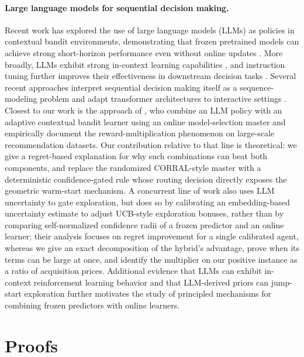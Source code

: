 \documentclass{article}
\theoremstyle{definition}
\theoremstyle{remark}
\theoremstyle{remark}
\begin{document}
\paragraph{Large language models for sequential decision making.}
Recent work has explored the use of large language models (LLMs) as policies
in contextual bandit environments, demonstrating that frozen pretrained
models can achieve strong short-horizon performance even without online
updates \cite{chen2024llmdecision}. More broadly, LLMs exhibit strong
in-context learning capabilities \cite{brown2020language,xie2021explanation,
garg2022can,akyurek2022learning}, and instruction tuning further improves
their effectiveness in downstream decision tasks
\cite{ouyang2022training,chung2024scaling}. Several recent approaches
interpret sequential decision making itself as a sequence-modeling problem
and adapt transformer architectures to interactive settings
\cite{chen2021decision,zheng2022online,reid2022can,sun2023smart,
raparthy2023generalization,lee2023supervised}.
Closest to our work is the approach of \cite{chen2024llmdecision}, who
combine an LLM policy with an adaptive contextual bandit learner using an
online model-selection master and empirically document the
reward-multiplication phenomenon on large-scale recommendation datasets.
Our contribution relative to that line is theoretical: we give a
regret-based explanation for why such combinations can beat both components,
and replace the randomized CORRAL-style master with a deterministic
confidence-gated rule whose routing decision directly exposes the geometric
warm-start mechanism. A concurrent line of work \cite{huangcontextual} also
uses LLM uncertainty to gate exploration, but does so by calibrating an
embedding-based uncertainty estimate to adjust UCB-style exploration
bonuses, rather than by comparing self-normalized confidence radii of a
frozen predictor and an online learner; their analysis focuses on regret
improvement for a single calibrated agent, whereas we give an exact
decomposition of the hybrid's advantage, prove when its terms can be large
at once, and identify the multiplier on our positive instance as a ratio of
acquisition prices. Additional evidence that LLMs can
exhibit in-context reinforcement learning behavior
\cite{monea2024llms,krishnamurthy2024can} and that LLM-derived priors can
jump-start exploration \cite{alamdari2024jumpstarting,abbasiyadkori2024believe}
further motivates the study of principled mechanisms for combining frozen
predictors with online learners.


\section{Proofs}
\label{app:proofs}
\end{document}
